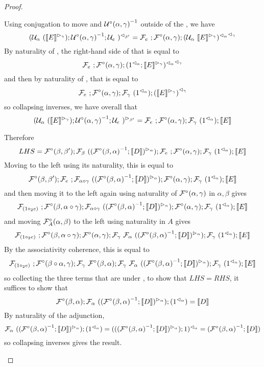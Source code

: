 \documentclass{drl-common/llncs}
\renewcommand{\sem}[1]{\ensuremath{ \llbracket #1 \rrbracket}}
\newcommand{\inv}[1]{\ensuremath{{#1}^{-1}}}
\newcommand\compo[2]{\ensuremath{#1 \circ #2}}
\newcommand\comph[2]{\ensuremath{#1 \mathbin{\circ_2} #2}}
\begin{document}
\begin{proof}
\begin{itemize}
Using conjugation to move  and
\inv{\semUcomp(\alpha,\gamma)} outside of the , we have
\[
\semrtol{(\semU{\alpha}{(\semltor{\sem{E}}{\gamma})};\inv{\semUcomp(\alpha,\gamma)};\semU{e})}{\beta'}
= 
\semF{e};\semFcomp(\alpha,\gamma);\semrtol{{\semrtol{(\semU{\alpha}{\semltor{\sem E}{\gamma}})}{\alpha}}}{\gamma}
\]
By naturality of \semrtol{-}{\alpha}, the right-hand side of that is equal to
\[
\semF{e};\semFcomp(\alpha,\gamma);\semrtol{{\semrtol{(\semrtol{1}{\alpha};\semltor{\sem{E}}{\gamma})}{\alpha}}}{\gamma}
\]
and then by naturality of \semrtol{-}{\gamma}, that is equal to
\[
\semF{e};\semFcomp(\alpha,\gamma);\semF{\gamma}{(\semrtol{1}{\alpha})};\semrtol{{{(\semltor{\sem{E}}{\gamma})}}}{\gamma}
\]
so collapsing inverses, we have overall that
\[
\semltor{(\semU{\alpha}{(\semltor{\sem{E}}{\gamma})};\inv{\semUcomp(\alpha,\gamma)};\semU{e})}{\beta'}
=
\semF{e};\semFcomp(\alpha,\gamma);\semF{\gamma}{(\semrtol{1}{\alpha})};\sem{E}
\]

Therefore 
\[
LHS = \semFcomp(\beta,\beta');\semF{\beta}{(\semltor{(\inv{\semFcomp(\beta,\alpha)};\sem{D})}{\alpha}  )};
\semF{e};\semFcomp(\alpha,\gamma);\semF{\gamma}{(\semrtol{1}{\alpha})};\sem{E}
\]
Moving  to the left using its naturality, this is equal to
\[
\semFcomp(\beta,\beta');\semF{e};\semF{\compo{\alpha}{\gamma}}{(\semltor{(\inv{\semFcomp(\beta,\alpha)};\sem{D})}{\alpha}  )} ;\semFcomp(\alpha,\gamma);\semF{\gamma}{(\semrtol{1}{\alpha})};\sem{E}
\]
and then moving it to the left again using naturality of
$\mathcal{F}^\circ(\alpha,\gamma)$ in $\alpha,\beta$ gives
\[
\semF{(\comph{1}{e})};\semFcomp(\beta,\compo{\alpha}{\gamma});\semF{\compo{\alpha}{\gamma}}{(\semltor{(\inv{\semFcomp(\beta,\alpha)};\sem{D})}{\alpha}  )};\semFcomp(\alpha,\gamma);\semF{\gamma}{(\semrtol{1}{\alpha})};\sem{E}
\]
and moving $\mathcal{F}^\circ_A(\alpha,\beta)$ to the left using naturality in $A$ gives
\[
\semF{(\comph{1}{e})};\semFcomp(\beta,\compo{\alpha}{\gamma});\semFcomp(\alpha,\gamma);\semF{\gamma}{\semF{\alpha}{(\semltor{(\inv{\semFcomp(\beta,\alpha)};\sem{D})}{\alpha}  )}};\semF{\gamma}{(\semrtol{1}{\alpha})};\sem{E}
\]
By the associativity coherence, this is equal to
\[
\semF{(\comph{1}{e})};\semFcomp(\compo{\beta}{\alpha},{\gamma});\semF{\gamma}{\semFcomp(\beta,\alpha)};\semF{\gamma}{\semF{\alpha}{(\semltor{(\inv{\semFcomp(\beta,\alpha)};\sem{D})}{\alpha}  )}};\semF{\gamma}{(\semrtol{1}{\alpha})};\sem{E}
\]
so collecting the three terms that are under \semF{\gamma}, to show that $LHS
= RHS$, it suffices to show that
\[
{\semFcomp(\beta,\alpha)};{\semF{\alpha}{(\semltor{(\inv{\semFcomp(\beta,\alpha)};\sem{D})}{\alpha})}};{(\semrtol{1}{\alpha})} = \sem D
\]
By naturality of the adjunction,
\[
\semF{\alpha}{(\semltor{(\inv{\semFcomp(\beta,\alpha)};\sem{D})}{\alpha})};(\semrtol{1}{\alpha})
= 
\semrtol{({(\semltor{(\inv{\semFcomp(\beta,\alpha)};\sem{D})}{\alpha})};1)}{\alpha}
=
{(\inv{\semFcomp(\beta,\alpha)};\sem{D})}
\]
so collapsing inverses gives the result.  


\end{itemize}
\end{proof}
\end{document}
